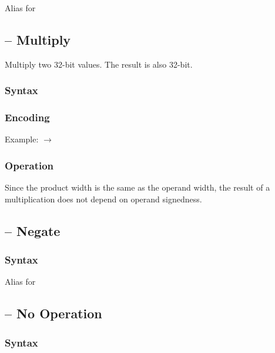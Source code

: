 \documentclass[a4paper,12pt,twoside,extrafontsizes]{memoir}
\begin{document}
{

Alias for 

\subsection{ -- Multiply}
\label{subsec:instr:mul}

Multiply two 32-bit values. The result is also 32-bit.

\subsubsection{Syntax}


\subsubsection{Encoding}


Example:  $\rightarrow$ 

\subsubsection{Operation}


Since the product width is the same as the operand width, the result of a multiplication does not depend on operand signedness.

\subsection{ -- Negate}
\label{subsec:instr:neg}

\subsubsection{Syntax}


Alias for 

\subsection{ -- No Operation}
\label{subsec:instr:nop}

\subsubsection{Syntax}

}
\end{document}
